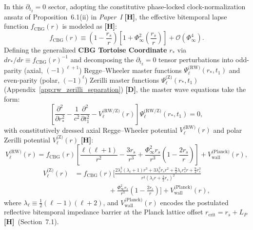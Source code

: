\documentclass[11pt,a4paper]{article}
\newcommand{\catD}{\textbf{\textcolor{blue!75!black}{[D]}}}
\newcommand{\catH}{\textbf{\textcolor{orange!85!black}{[H]}}}
\theoremstyle{plain}
\theoremstyle{definition}
\theoremstyle{remark}
\numberwithin{equation}{section}
\begin{document}
In this $\partial_{t_2} = 0$ sector, adopting the constitutive phase-locked clock-normalization ansatz of Proposition~6.1(ii) in \textit{Paper~I} \cite{jimenez2026a} \catH, the effective bitemporal lapse function $f_{\text{CBG}}(r)$ is modeled as \catH:
\begin{equation}
f_{\text{CBG}}(r) \equiv \left(1 - \frac{r_s}{r}\right) \left[ 1 + \Phi_{\infty}^2 \left(\frac{r_s}{r}\right) \right] + \mathcal{O}\left(\Phi_{\infty}^4\right).
\label{eq:f_cbg_lapse}
\end{equation}
Defining the generalized \textbf{CBG Tortoise Coordinate} $r_*$ via $dr_*/dr \equiv f_{\text{CBG}}(r)^{-1}$ and decomposing the $\partial_{t_2} = 0$ tensor perturbations into odd-parity (axial, $(-1)^{\ell+1}$) Regge--Wheeler master functions $\Psi_{\ell}^{\text{(RW)}}(r_*, t_1)$ \cite{regge1957} and even-parity (polar, $(-1)^\ell$) Zerilli master functions $\Psi_{\ell}^{\text{(Z)}}(r_*, t_1)$ \cite{zerilli1970} (Appendix~\ref{app:rw_zerilli_separation}) \catD, the master wave equations take the form:
\begin{equation}
\left[ \frac{\partial^2}{\partial r_*^2} - \frac{1}{c^2}\frac{\partial^2}{\partial t_1^2} - V_{\ell}^{\text{(RW/Z)}}(r) \right] \Psi_{\ell}^{\text{(RW/Z)}}(r_*, t_1) = 0,
\label{eq:master_rw_zerilli_wave}
\end{equation}
with constitutively dressed axial Regge--Wheeler potential $V_{\ell}^{\text{(RW)}}(r)$ and polar Zerilli potential $V_{\ell}^{\text{(Z)}}(r)$ \catH:
\begin{equation}
V_{\ell}^{\text{(RW)}}(r) = f_{\text{CBG}}(r) \left[ \frac{\ell(\ell+1)}{r^2} - \frac{3 r_s}{r^3} + \frac{\Phi_{\infty}^2 r_s}{r^3}\left(1 - \frac{2 r_s}{r}\right) \right] + V_{\text{wall}}^{\text{(Planck)}}(r),
\label{eq:v_rw_cbg}
\end{equation}
\begin{align}
V_{\ell}^{\text{(Z)}}(r) &= f_{\text{CBG}}(r) \Bigg[ \frac{2\lambda_{\ell}^2(\lambda_{\ell}+1)r^3 + 3\lambda_{\ell}^2 r_s r^2 + \frac{9}{2}\lambda_{\ell} r_s^2 r + \frac{9}{4}r_s^3}{r^3\left(\lambda_{\ell} r + \frac{3}{2}r_s\right)^2} \nonumber \\[3pt]
&\qquad\qquad\quad + \frac{\Phi_{\infty}^2 r_s}{r^3}\left(1 - \frac{2 r_s}{r}\right) \Bigg] + V_{\text{wall}}^{\text{(Planck)}}(r),
\label{eq:v_zerilli_cbg}
\end{align}
where $\lambda_{\ell} \equiv \frac{1}{2}(\ell - 1)(\ell + 2)$, and $V_{\text{wall}}^{\text{(Planck)}}(r)$ encodes the postulated reflective bitemporal impedance barrier at the Planck lattice offset $r_{\text{crit}} = r_s + L_P$ \catH\ (Section~7.1).
\end{document}
